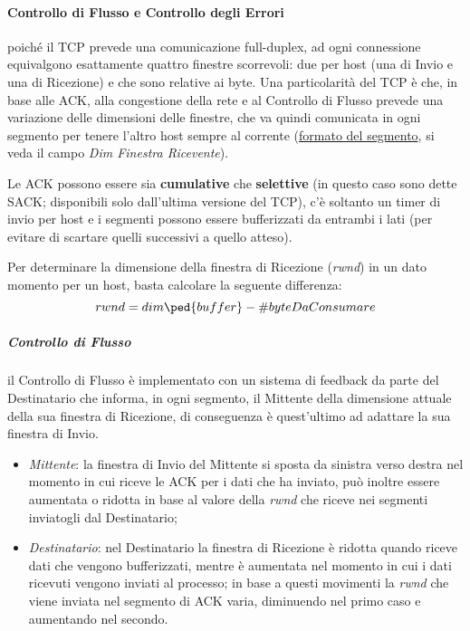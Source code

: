 \documentclass[a4paper]{article}
\begin{document}
					\newpage						
					
				\paragraph{Controllo di Flusso e Controllo degli Errori}
					poiché il TCP prevede una comunicazione full-duplex, ad ogni connessione equivalgono esattamente quattro finestre scorrevoli: due per host (una di Invio e una di Ricezione) e che sono relative ai byte. Una particolarità del TCP è che, in base alle ACK, alla congestione della rete e al Controllo di Flusso prevede una variazione delle dimensioni delle finestre, che va quindi comunicata in ogni segmento per tenere l'altro host sempre al corrente (\hyperref[par:formatoSegmento]{formato del segmento}, si veda il campo \emph{Dim Finestra Ricevente}).
					
					Le ACK possono essere sia \textbf{cumulative} che \textbf{selettive} (in questo caso sono dette SACK; disponibili solo dall'ultima versione del TCP), c'è soltanto un timer di invio per host e i segmenti possono essere bufferizzati da entrambi i lati (per evitare di scartare quelli successivi a quello atteso).
					
					Per determinare la dimensione della finestra di Ricezione (\emph{rwnd}) in un dato momento per un host, basta calcolare la seguente differenza:
					\[ rwnd = dim\ped{buffer} - \#byteDaConsumare \]
					
					\subparagraph{Controllo di Flusso}
						il Controllo di Flusso è implementato con un sistema di feedback da parte del Destinatario che informa, in ogni segmento, il Mittente della dimensione attuale della sua finestra di Ricezione, di conseguenza è quest'ultimo ad adattare la sua finestra di Invio.
						\begin{itemize}
							\item \emph{Mittente}: la finestra di Invio del Mittente si sposta da sinistra verso destra nel momento in cui riceve le ACK per i dati che ha inviato, può inoltre essere aumentata o ridotta in base al valore della \emph{rwnd} che riceve nei segmenti inviatogli dal Destinatario;
							\item \emph{Destinatario}: nel Destinatario la finestra di Ricezione è ridotta quando riceve dati che vengono bufferizzati, mentre è aumentata nel momento in cui i dati ricevuti vengono inviati al processo; in base a questi movimenti la \emph{rwnd} che viene inviata nel segmento di ACK varia, diminuendo nel primo caso e aumentando nel secondo.
						\end{itemize}
						
\end{document}
